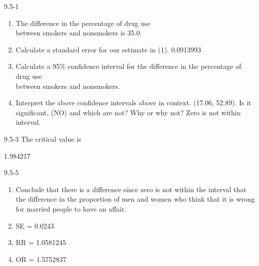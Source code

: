 \begin{exsol@solution}{9.5-1}


\begin{enumerate}
\item The difference in the percentage of drug use \\ between smokers and nonsmokers is 35.0.
\item Calculate a standard error for our estimate in (1).  0.0913993
\item Calculate a 95\% confidence interval for the difference in the percentage of drug use \\ between smokers and nonsmokers.
\item Interpret the above confidence intervals above in context.  (17.06, 52.89). Is it significant, (NO) and which are not? Why or why not? Zero is not within interval.
\end{enumerate}

\end{exsol@solution}
\begin{exsol@solution}{9.5-3}
   The critical value is


  1.984217

\end{exsol@solution}
\begin{exsol@solution}{9.5-5}



	  \begin{enumerate}
	  \item Conclude that there is a difference since zero is not within the interval that the difference in the proportion of men and women who think that it is wrong for married people to have an affair.
	  \item SE = 0.0243
	  \item RR = 1.0581245
	  \item OR = 1.5752837
	  \end{enumerate}

\end{exsol@solution}
